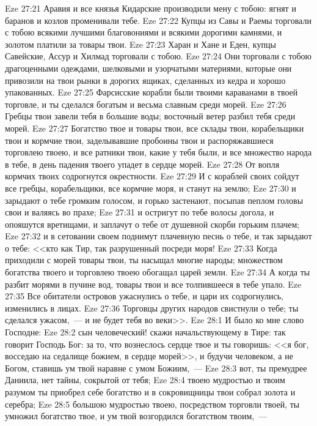 \vs Eze 27:21 Аравия и все князья Кидарские производили мену с тобою: ягнят и баранов и козлов променивали тебе.
\vs Eze 27:22 Купцы из Савы и Раемы торговали с тобою всякими лучшими благовониями и всякими дорогими камнями, и золотом платили за товары твои.
\vs Eze 27:23 Харан и Хане и Еден, купцы Савейские, Ассур и Хилмад торговали с тобою.
\vs Eze 27:24 Они торговали с тобою драгоценными одеждами, шелковыми и узорчатыми материями, которые они привозили на твои рынки в дорогих ящиках, сделанных из кедра и хорошо упакованных.
\vs Eze 27:25 Фарсисские корабли были твоими караванами в твоей торговле, и ты сделался богатым и весьма славным среди морей.
\vs Eze 27:26 Гребцы твои завели тебя в большие воды; восточный ветер разбил тебя среди морей.
\vs Eze 27:27 Богатство твое и товары твои, все склады твои, корабельщики твои и кормчие твои, заделывавшие пробоины твои и распоряжавшиеся торговлею твоею, и все ратники твои, какие у тебя были, и все множество народа в тебе, в день падения твоего упадет в сердце морей.
\vs Eze 27:28 От вопля кормчих твоих содрогнутся окрестности.
\vs Eze 27:29 И с кораблей своих сойдут все гребцы, корабельщики, все кормчие моря, и станут на землю;
\vs Eze 27:30 и зарыдают о тебе громким голосом, и горько застенают, посыпав пеплом головы свои и валяясь во прахе;
\vs Eze 27:31 и остригут по тебе волосы догола, и опояшутся вретищами, и заплачут о тебе от душевной скорби горьким плачем;
\vs Eze 27:32 и в сетовании своем поднимут плачевную песнь о тебе, и так зарыдают о тебе: <<кто как Тир, так разрушенный посреди моря!
\vs Eze 27:33 Когда приходили с морей товары твои, ты насыщал многие народы; множеством богатства твоего и торговлею твоею обогащал царей земли.
\vs Eze 27:34 А когда ты разбит морями в пучине вод, товары твои и все толпившееся в тебе упало.
\vs Eze 27:35 Все обитатели островов ужаснулись о тебе, и цари их содрогнулись, изменились в лицах.
\vs Eze 27:36 Торговцы других народов свистнули о тебе; ты сделался ужасом,~--- и не будет тебя во веки>>.
\vs Eze 28:1 И было ко мне слово Господне:
\vs Eze 28:2 сын человеческий! скажи начальствующему в Тире: так говорит Господь Бог: за то, что вознеслось сердце твое и ты говоришь: <<я бог, восседаю на седалище божием, в сердце морей>>, и будучи человеком, а не Богом, ставишь ум твой наравне с умом Божиим,~---
\vs Eze 28:3 вот, ты премудрее Даниила, нет тайны, сокрытой от тебя;
\vs Eze 28:4 твоею мудростью и твоим разумом ты приобрел себе богатство и в сокровищницы твои собрал золота и серебра;
\vs Eze 28:5 большою мудростью твоею, посредством торговли твоей, ты умножил богатство твое, и ум твой возгордился богатством твоим,~---
